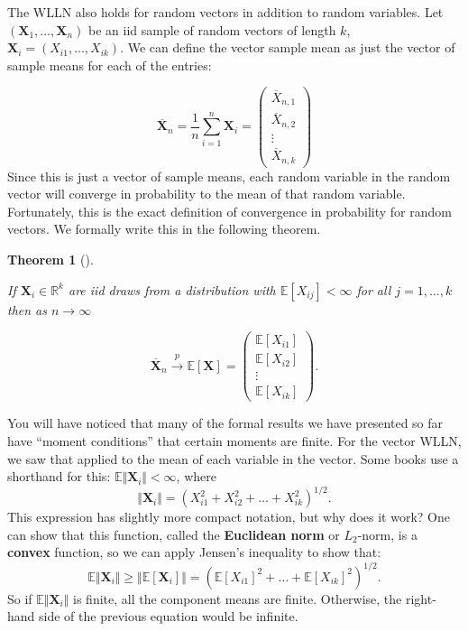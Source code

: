 \documentclass[
  letterpaper,
  DIV=11,
  numbers=noendperiod]{scrreprt}
\newcommand{\mb}{\symbf}
\newcommand{\E}{\mathbb{E}}
\newcommand{\Xbar}{\overline{X}}
\newcommand{\X}{\mb{X}}
\newcommand{\inprob}{\overset{p}{\to}}
\theoremstyle{definition}
\theoremstyle{plain}
\newtheorem{theorem}{Theorem}[chapter]
\theoremstyle{definition}
\theoremstyle{remark}
\begin{document}
The WLLN also holds for random vectors in addition to random variables.
Let \((\X_1, \ldots, \X_n)\) be an iid sample of random vectors of
length \(k\), \(\mb{X}_i = (X_{i1}, \ldots, X_{ik})\). We can define the
vector sample mean as just the vector of sample means for each of the
entries:

\[
\overline{\mb{X}}_n = \frac{1}{n} \sum_{i=1}^n \mb{X}_i =
\begin{pmatrix}
\Xbar_{n,1} \\ \Xbar_{n,2} \\ \vdots \\ \Xbar_{n, k}
\end{pmatrix}
\] Since this is just a vector of sample means, each random variable in
the random vector will converge in probability to the mean of that
random variable. Fortunately, this is the exact definition of
convergence in probability for random vectors. We formally write this in
the following theorem.

\begin{theorem}[]\protect\hypertarget{thm-vector-wlln}{}\label{thm-vector-wlln}

If \(\X_i \in \mathbb{R}^k\) are iid draws from a distribution with
\(\E[X_{ij}] < \infty\) for all \(j=1,\ldots,k\) then as
\(n\rightarrow\infty\)

\[
\overline{\mb{X}}_n \inprob \E[\X] =
\begin{pmatrix}
\E[X_{i1}] \\ \E[X_{i2}] \\ \vdots \\ \E[X_{ik}]
\end{pmatrix}.
\]

\end{theorem}

\begin{tcolorbox}[enhanced jigsaw, opacitybacktitle=0.6, bottomrule=.15mm, colback=white, colframe=quarto-callout-note-color-frame, arc=.35mm, opacityback=0, breakable, leftrule=.75mm, titlerule=0mm, left=2mm, rightrule=.15mm, toptitle=1mm, bottomtitle=1mm, toprule=.15mm, title=\textcolor{quarto-callout-note-color}{\faInfo}\hspace{0.5em}{Notation alert}, colbacktitle=quarto-callout-note-color!10!white, coltitle=black]

You will have noticed that many of the formal results we have presented
so far have ``moment conditions'' that certain moments are finite. For
the vector WLLN, we saw that applied to the mean of each variable in the
vector. Some books use a shorthand for this:
\(\E\Vert \X_i\Vert < \infty\), where \[
\Vert\X_i\Vert = \left(X_{i1}^2 + X_{i2}^2 + \ldots + X_{ik}^2\right)^{1/2}. 
\] This expression has slightly more compact notation, but why does it
work? One can show that this function, called the \textbf{Euclidean
norm} or \(L_2\)-norm, is a \textbf{convex} function, so we can apply
Jensen's inequality to show that: \[
\E\Vert \X_i\Vert \geq \Vert \E[\X_i] \Vert = (\E[X_{i1}]^2 + \ldots + \E[X_{ik}]^2)^{1/2}.
\] So if \(\E\Vert \X_i\Vert\) is finite, all the component means are
finite. Otherwise, the right-hand side of the previous equation would be
infinite.

\end{tcolorbox}
\end{document}

